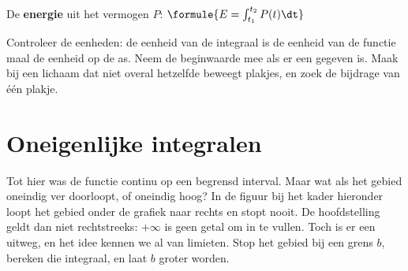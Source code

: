 
\begin{theorie}
De \textbf{\textcolor{accent}{energie}} uit het vermogen $P$: \quad $\formule{E = \int_{t_1}^{t_2} P(t)\dt}$
\end{theorie}

\begin{werkwijze}
Controleer de eenheden: de eenheid van de integraal is de eenheid van de functie maal de eenheid op de as. Neem de beginwaarde mee als er een gegeven is. Maak bij een lichaam dat niet overal hetzelfde beweegt plakjes, en zoek de bijdrage van één plakje.
\end{werkwijze}

\section{Oneigenlijke integralen}

Tot hier was de functie continu op een begrensd interval. Maar wat als het gebied oneindig ver doorloopt, of oneindig hoog? In de figuur bij het kader hieronder loopt het gebied onder de grafiek naar rechts en stopt nooit. De hoofdstelling geldt dan niet rechtstreeks: $+\infty$ is geen getal om in te vullen. Toch is er een uitweg, en het idee kennen we al van limieten. Stop het gebied bij een grens $b$, bereken die integraal, en laat $b$ groter worden.

